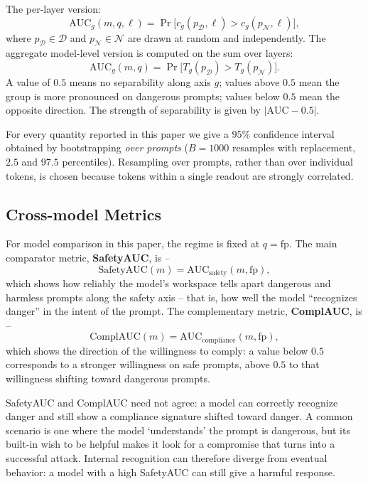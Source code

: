 \documentclass[10pt,twocolumn]{article}
\newcommand{\Dset}{\mathcal{D}}
\newcommand{\Nset}{\mathcal{N}}
\newcommand{\fp}{\mathrm{fp}}
\newcommand{\AUC}{\mathrm{AUC}}
\begin{document}
The per-layer version:
\begin{equation}
\AUC_g(m,q,\ell) = \Pr\big[c_g(p_\Dset,\ell) > c_g(p_\Nset,\ell)\big],
\label{eq:layer-auc}
\end{equation}
where $p_\Dset\in\Dset$ and $p_\Nset\in\Nset$ are drawn at random and independently. The aggregate
model-level version is computed on the sum over layers:
\begin{equation}
\AUC_g(m,q) = \Pr\big[T_g(p_\Dset) > T_g(p_\Nset)\big].
\label{eq:agg-auc}
\end{equation}
A value of $0.5$ means no separability along axis $g$; values above $0.5$ mean the
group is more pronounced on dangerous prompts; values below $0.5$ mean the opposite direction. The strength of separability is given by $|\AUC-0.5|$.

For every quantity reported in this paper we give a $95\%$ confidence interval obtained by bootstrapping \emph{over prompts} ($B=1000$ resamples with replacement, $2.5$ and $97.5$ percentiles).
Resampling over prompts, rather than over individual tokens, is chosen because tokens within a single readout are strongly correlated.

\subsection{Cross-model Metrics}
\label{sec:cross-model}

For model comparison in this paper, the regime is fixed at $q=\fp$. The main comparator metric, \textbf{SafetyAUC}, is --
\begin{equation}
\mathrm{SafetyAUC}(m) = \AUC_{\mathrm{safety}}(m,\fp),
\label{eq:safetyauc}
\end{equation}
which shows how reliably the model's workspace tells apart dangerous and harmless prompts
along the safety axis -- that is, how well the model ``recognizes danger'' in the intent of the prompt. The complementary metric, \textbf{ComplAUC}, is --
\begin{equation}
\mathrm{ComplAUC}(m) = \AUC_{\mathrm{compliance}}(m,\fp),
\label{eq:complauc}
\end{equation}
which shows the direction of the willingness to comply: a value below $0.5$ corresponds to a stronger
willingness on safe prompts, above $0.5$ to that willingness shifting toward dangerous
prompts.

SafetyAUC and ComplAUC need not agree: a model can correctly recognize danger and still show a compliance signature shifted toward danger. A common scenario is one where the model `understands' the prompt is dangerous, but its built-in wish to be helpful makes it look for a compromise that turns into a successful attack. Internal recognition can therefore diverge from eventual behavior: a model with a high SafetyAUC can still give a harmful response.
\end{document}
